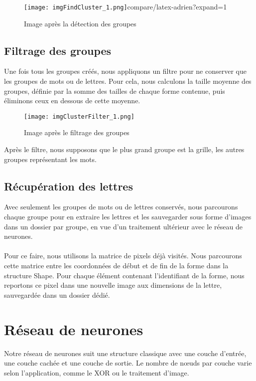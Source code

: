 \documentclass{article}
\begin{document}
\begin{figure}[H]
    \centering
    \texttt{[image: imgFindCluster\_1.png]}compare/latex-adrien?expand=1
    \caption{Image après la détection des groupes}
\end{figure}

\subsection{Filtrage des groupes}

Une fois tous les groupes créés, nous appliquons un filtre pour ne conserver que les groupes de mots ou de lettres. Pour cela, nous calculons la taille moyenne des groupes, définie par la somme des tailles de chaque forme contenue, puis éliminons ceux en dessous de cette moyenne.

\begin{figure}[H]
    \centering
    \texttt{[image: imgClusterFilter\_1.png]}
    \caption{Image après le filtrage des groupes}
\end{figure}

Après le filtre, nous supposons que le plus grand groupe est la grille, les autres groupes représentant les mots.

\subsection{Récupération des lettres}

Avec seulement les groupes de mots ou de lettres conservés, nous parcourons chaque groupe pour en extraire les lettres et les sauvegarder sous forme d'images dans un dossier par groupe, en vue d’un traitement ultérieur avec le réseau de neurones.
\\\\
Pour ce faire, nous utilisons la matrice de pixels déjà visités. Nous parcourons cette matrice entre les coordonnées de début et de fin de la forme dans la structure Shape. Pour chaque élément contenant l'identifiant de la forme, nous reportons ce pixel dans une nouvelle image aux dimensions de la lettre, sauvegardée dans un dossier dédié.
\newpage
\section{Réseau de neurones}

Notre réseau de neurones suit une structure classique avec une couche d’entrée, une couche cachée et une couche de sortie. Le nombre de nœuds par couche varie selon l'application, comme le XOR ou le traitement d'image.
\end{document}
